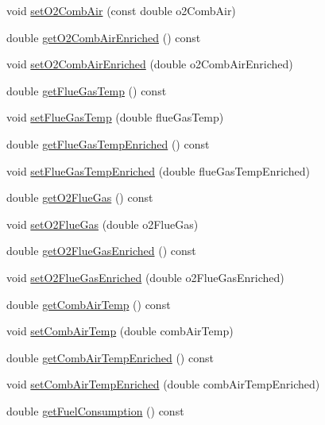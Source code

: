 \begin{DoxyCompactItemize}
\item 
void \hyperlink{class_o2_enrichment_a4ed21239c9e2ed2b193c94e9df0a9079}{set\+O2\+Comb\+Air} (const double o2\+Comb\+Air)
\item 
double \hyperlink{class_o2_enrichment_a0e9a9ec7987eaa673cb9527b293ded7c}{get\+O2\+Comb\+Air\+Enriched} () const
\item 
void \hyperlink{class_o2_enrichment_af781223d8201c4e5a1d0085718b0b36c}{set\+O2\+Comb\+Air\+Enriched} (double o2\+Comb\+Air\+Enriched)
\item 
double \hyperlink{class_o2_enrichment_a53083756c50aaf89f755a132b62e999b}{get\+Flue\+Gas\+Temp} () const
\item 
void \hyperlink{class_o2_enrichment_a37e625de13b171a6db256a108455aab9}{set\+Flue\+Gas\+Temp} (double flue\+Gas\+Temp)
\item 
double \hyperlink{class_o2_enrichment_ab69ee84a1b662e4c1f9a49d23acc6f00}{get\+Flue\+Gas\+Temp\+Enriched} () const
\item 
void \hyperlink{class_o2_enrichment_a787af9e47a73f2416d6c5d23aaf6d659}{set\+Flue\+Gas\+Temp\+Enriched} (double flue\+Gas\+Temp\+Enriched)
\item 
double \hyperlink{class_o2_enrichment_a1d31e1aef5f5a92f38c9a07216d0e539}{get\+O2\+Flue\+Gas} () const
\item 
void \hyperlink{class_o2_enrichment_aef67aa13531717c0d1832921ce6d27ae}{set\+O2\+Flue\+Gas} (double o2\+Flue\+Gas)
\item 
double \hyperlink{class_o2_enrichment_a274eddb78560dd502a3c5947ac7e6b96}{get\+O2\+Flue\+Gas\+Enriched} () const
\item 
void \hyperlink{class_o2_enrichment_a9866f25fe54e561579079ee1a3889c2d}{set\+O2\+Flue\+Gas\+Enriched} (double o2\+Flue\+Gas\+Enriched)
\item 
double \hyperlink{class_o2_enrichment_ad3e6bab8c49a1ae5232330fc0e1a537a}{get\+Comb\+Air\+Temp} () const
\item 
void \hyperlink{class_o2_enrichment_a70636d71deb4db00ddf761b0dffa3f36}{set\+Comb\+Air\+Temp} (double comb\+Air\+Temp)
\item 
double \hyperlink{class_o2_enrichment_ad628ffe961a2733c60e5008fd044eabe}{get\+Comb\+Air\+Temp\+Enriched} () const
\item 
void \hyperlink{class_o2_enrichment_af245c75ea525a0f5955686b360b54dbb}{set\+Comb\+Air\+Temp\+Enriched} (double comb\+Air\+Temp\+Enriched)
\item 
double \hyperlink{class_o2_enrichment_a48d73aca893ac689880b1d10faa399a5}{get\+Fuel\+Consumption} () const

\end{DoxyCompactItemize}
